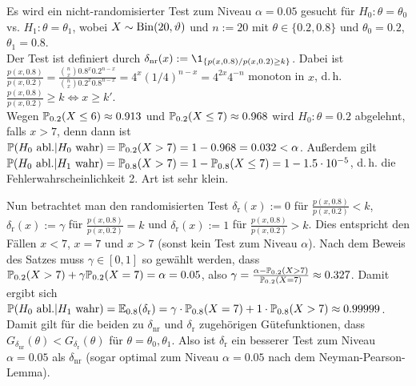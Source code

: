 \linie
\pagebreak

\begin{Bsp}
    Es wird ein nicht-randomisierter Test zum Niveau $\alpha = 0.05$ gesucht für
    $H_0\colon \theta = \theta_0$ vs. $H_1\colon \theta = \theta_1$, wobei
    $X \sim \operatorname{Bin}(20, \vartheta)$ und $n := 20$ mit $\theta \in \{0.2, 0.8\}$ und
    $\theta_0 = 0.2$, $\theta_1 = 0.8$.\\
    Der Test ist definiert durch $\delta_{\text{nr}}(x) := \1_{\{p(x, 0.8)/p(x, 0.2) \ge k\}}$.
    Dabei ist\\$\frac{p(x, 0.8)}{p(x, 0.2)} =
    \frac{\binom{n}{x} 0.8^x 0.2^{n-x}}{\binom{n}{x} 0.2^x 0.8^{n-x}}
    = 4^x (1/4)^{n-x} = 4^{2x} 4^{-n}$ monoton in $x$,
    d.\,h. $\frac{p(x, 0.8)}{p(x, 0.2)} \ge k \iff x \ge k'$.\\
    Wegen $\mathbb{P}_{0.2}(X \le 6) \approx 0.913$ und $\mathbb{P}_{0.2}(X \le 7) \approx 0.968$ wird
    $H_0\colon \theta = 0.2$ abgelehnt, falls $x > 7$,
    denn dann ist $\mathbb{P}(H_0 \text{ abl.} | H_0 \text{ wahr}) = \mathbb{P}_{0.2}(X > 7)
    = 1 - 0.968 = 0.032 < \alpha$.
    Außerdem gilt $\mathbb{P}(H_0 \text{ abl.} | H_1 \text{ wahr}) = \mathbb{P}_{0.8}(X > 7)
    = 1 - \mathbb{P}_{0.8}(X \le 7) = 1 - 1.5 \cdot 10^{-5}$,
    d.\,h. die Fehlerwahrscheinlichkeit 2. Art ist sehr klein.

    Nun betrachtet man den randomisierten Test
    $\delta_{\text{r}}(x) := 0$ für $\frac{p(x, 0.8)}{p(x, 0.2)} < k$,
    $\delta_{\text{r}}(x) := \gamma$ für $\frac{p(x, 0.8)}{p(x, 0.2)} = k$ und
    $\delta_{\text{r}}(x) := 1$ für $\frac{p(x, 0.8)}{p(x, 0.2)} > k$.
    Dies entspricht den Fällen $x < 7$, $x = 7$ und $x > 7$
    (sonst kein Test zum Niveau $\alpha$).
    Nach dem Beweis des Satzes muss $\gamma \in [0, 1]$ so gewählt werden, dass
    $\mathbb{P}_{0.2}(X > 7) + \gamma \mathbb{P}_{0.2}(X = 7) = \alpha = 0.05$,
    also $\gamma = \frac{\alpha - \mathbb{P}_{0.2}(X > 7)}{\mathbb{P}_{0.2}(X = 7)} \approx 0.327$.
    Damit ergibt sich
    $\mathbb{P}(H_0 \text{ abl.} | H_1 \text{ wahr}) = \mathbb{E}_{0.8}(\delta_{\text{r}})
    = \gamma \cdot \mathbb{P}_{0.8}(X = 7) + 1 \cdot \mathbb{P}_{0.8}(X > 7) \approx 0.99999$.
    Damit gilt für die beiden zu $\delta_{\text{nr}}$ und $\delta_{\text{r}}$ zugehörigen
    Gütefunktionen, dass
    $G_{\delta_{\text{nr}}}(\theta) < G_{\delta_{\text{r}}}(\theta)$ für
    $\theta = \theta_0, \theta_1$.
    Also ist $\delta_{\text{r}}$ ein besserer Test zum Niveau $\alpha = 0.05$
    als $\delta_{\text{nr}}$ (sogar optimal zum Niveau $\alpha = 0.05$ nach dem
    Neyman-Pearson-Lemma).
\end{Bsp}

